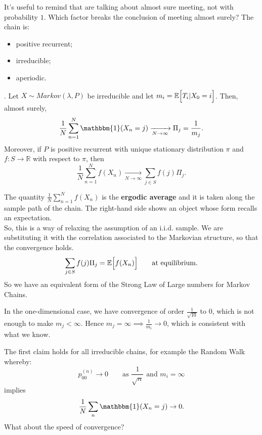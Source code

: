 \documentclass{article}
\begin{document}
It's useful to remind that are talking about almost sure meeting, not with probability $1$. Which factor breaks the conclusion of meeting almost surely? The chain is:
\begin{itemize}
    \item positive recurrent;
    \item irreducible;
    \item {} aperiodic.
\end{itemize}
\begin{theorem}
    . Let $X\sim Markov(\lambda,P)$ be irreducible and let $m_i=\mathbb{E}\Bigl[T_i|X_0=i\Bigr]$. Then, almost surely,
        \[\frac{1}{N}\sum_{n=1}^N\mathbbm{1}(X_n=j)\xrightarrow[N\rightarrow\infty]{}\Pi_j=\frac{1}{m_j}.\]
        Moreover, if $P$ is positive recurrent with unique stationary distribution $\pi$ and $f:S\rightarrow\mathbb{R}$ with respect to $\pi$, then
        \[\frac{1}{N}\sum_{n=1}^Nf(X_n)\xrightarrow[N\rightarrow\infty]{}\sum_{j\in S}f(j)\Pi_j.\]
\end{theorem}
The quantity $\frac{1}{N}\sum_{n=1}^Nf(X_n)$ is the \textbf{ergodic average} and it is taken along the sample path of the chain. The right-hand side shows an object whose form recalls an expectation. \\
So, this is a way of relaxing the assumption of an i.i.d. sample. We are substituting it with the correlation associated to the Markovian structure, so that the convergence holds. 
\[\sum_{j\in S}f(j)\Pi_j=\mathbb{E}\Bigl[{f(X_n)}\Bigr] \qquad \text{at equilibrium.}\]
So we have an equivalent form of the Strong Law of Large numbers for Markov Chains.
\begin{remark}
    In the one-dimensional case, we have convergence of order $\frac{1}{\sqrt{10}}$ to $0$, which is not enough to make $m_j < \infty$. Hence $m_j = \infty \implies \frac{1}{m_i} \rightarrow 0$, which is consistent with what we know.
\end{remark}
The first claim holds for all irreducible chains, for example the Random Walk whereby:
\[p_{00}^{(n)}\rightarrow0 \qquad\text{as }\frac{1}{\sqrt{n}}\text{ and }m_i=\infty\]
implies
\[\frac{1}{N}\sum_n\mathbbm{1}(X_n=j)\rightarrow0.\]
What about the speed of convergence?
\end{document}
